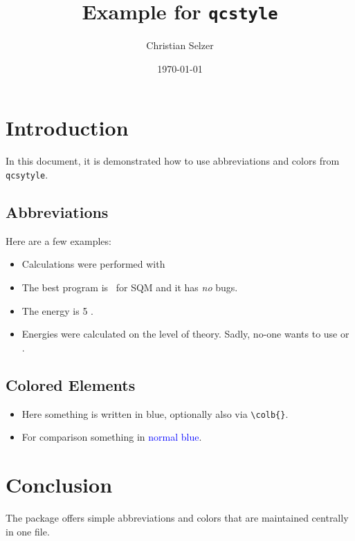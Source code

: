 \documentclass[a4paper,12pt]{article}
\title{Example for \texttt{qcstyle}}
\author{Christian Selzer}
\date{\today}
\begin{document}
\maketitle

\section{Introduction}

    In this document, it is demonstrated how to use abbreviations and colors from \texttt{qcsytyle}.

\subsection{Abbreviations}
    Here are a few examples:
    \begin{itemize}
      \item Calculations were performed with \orca\
      \item The best program is \xtb\ for SQM and it has \emph{no} bugs.
      \item The energy is 5 \kcalmol.
      \item Energies were calculated on the  level of theory. Sadly, no-one wants to use  or .
    \end{itemize}

\subsection{Colored Elements}
    \begin{itemize}
        \item Here something is written in \textcolor{bonnblue}{blue}, optionally also via \verb|\colb{}|.
        \item For comparison something in \textcolor{blue}{normal blue}.
    \end{itemize}


\section{Conclusion}
    The package offers simple abbreviations and colors that are maintained centrally in one file.
\end{document}
